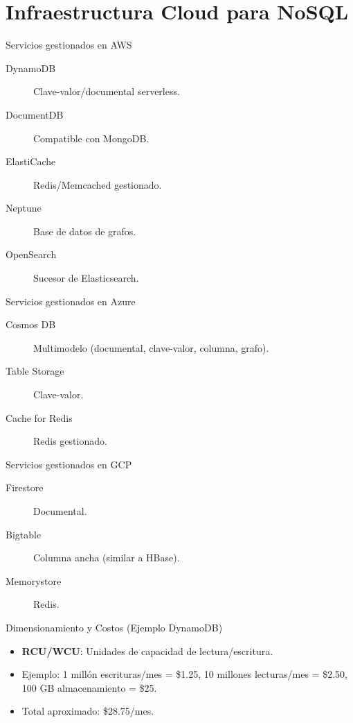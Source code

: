 \documentclass[aspectratio=169, 10pt, xcolor=table]{beamer}
\begin{document}
\section{Infraestructura Cloud para NoSQL}

\begin{frame}{Servicios gestionados en AWS}
    \begin{description}
        \item[DynamoDB] Clave-valor/documental serverless.
        \item[DocumentDB] Compatible con MongoDB.
        \item[ElastiCache] Redis/Memcached gestionado.
        \item[Neptune] Base de datos de grafos.
        \item[OpenSearch] Sucesor de Elasticsearch.
    \end{description}
\end{frame}

\begin{frame}{Servicios gestionados en Azure}
    \begin{description}
        \item[Cosmos DB] Multimodelo (documental, clave-valor, columna, grafo).
        \item[Table Storage] Clave-valor.
        \item[Cache for Redis] Redis gestionado.
    \end{description}
\end{frame}

\begin{frame}{Servicios gestionados en GCP}
    \begin{description}
        \item[Firestore] Documental.
        \item[Bigtable] Columna ancha (similar a HBase).
        \item[Memorystore] Redis.
    \end{description}
\end{frame}

\begin{frame}{Dimensionamiento y Costos (Ejemplo DynamoDB)}
    \begin{itemize}
        \item \textbf{RCU/WCU}: Unidades de capacidad de lectura/escritura.
        \item Ejemplo: 1 millón escrituras/mes = \$1.25, 10 millones lecturas/mes = \$2.50, 100 GB almacenamiento = \$25.
        \item Total aproximado: \$28.75/mes.
    \end{itemize}
\end{frame}
\end{document}

